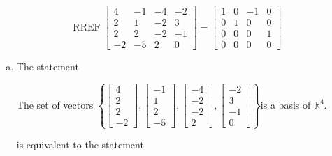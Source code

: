 \begin{exerciseAnswer} 


\[\operatorname{RREF} \left[\begin{array}{cccc}
4 & -1 & -4 & -2 \\
2 & 1 & -2 & 3 \\
2 & 2 & -2 & -1 \\
-2 & -5 & 2 & 0
\end{array}\right] = \left[\begin{array}{cccc}
1 & 0 & -1 & 0 \\
0 & 1 & 0 & 0 \\
0 & 0 & 0 & 1 \\
0 & 0 & 0 & 0
\end{array}\right] \]


\begin{enumerate}[(a)]
\item The statement 
\begin{center}\begin{minipage}{0.8\textwidth}
 The set of vectors \( \left\{ \left[\begin{array}{c}
4 \\
2 \\
2 \\
-2
\end{array}\right] , \left[\begin{array}{c}
-1 \\
1 \\
2 \\
-5
\end{array}\right] , \left[\begin{array}{c}
-4 \\
-2 \\
-2 \\
2
\end{array}\right] , \left[\begin{array}{c}
-2 \\
3 \\
-1 \\
0
\end{array}\right] \right\} \)is a basis of \(\mathbb{R}^4\). 
\end{minipage}\end{center}
     is equivalent to the statement 
\begin{center}\begin{minipage}{0.8\textwidth}
 The set of vectors \( \left\{ \left[\begin{array}{c}
4 \\
2 \\

\end{array}
\end{minipage}
\end{center}
\end{enumerate}
\end{exerciseAnswer}
